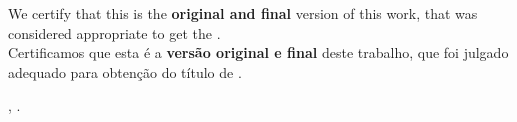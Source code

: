 \begin{folhadeaprovacao}
\begin{center}
    \vspace*{2\baselineskip}
    \begin{minipage}{\textwidth}
      \lang
      {
        We certify that this is the \textbf{original and final} version of this work, that was considered appropriate to get the \imprimirformacao.\\
      }
      {
        Certificamos que esta é a \textbf{versão original e final} deste trabalho, que foi julgado adequado para obtenção do título de \imprimirformacao.\\
      }
    \end{minipage}
    \vspace*{\fill}

    \vspace*{\fill}
    \assinatura{
      \OnehalfSpacing
      \textbf{\imprimirorientador} \\
      \imprimirorientadorRotulo
    }
    \vspace*{\fill}
    \imprimirlocal, \imprimirano.
  \end{center}


\end{folhadeaprovacao}